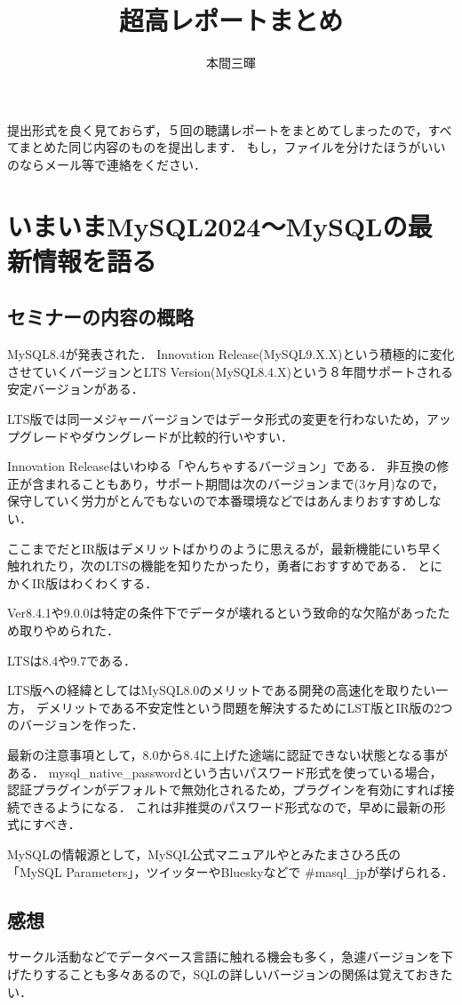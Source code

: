 \documentclass[titlepage,a4paper]{jsarticle}
\title{超高レポートまとめ}
\author{本間三暉}
\begin{document}
\maketitle
提出形式を良く見ておらず，５回の聴講レポートをまとめてしまったので，すべてまとめた同じ内容のものを提出します．
もし，ファイルを分けたほうがいいのならメール等で連絡をください．
\section{いまいまMySQL2024〜MySQLの最新情報を語る} %
\subsection{セミナーの内容の概略}
MySQL8.4が発表された．
Innovation Release(MySQL9.X.X)という積極的に変化させていくバージョンとLTS Version(MySQL8.4.X)という８年間サポートされる安定バージョンがある．

LTS版では同一メジャーバージョンではデータ形式の変更を行わないため，アップグレードやダウングレードが比較的行いやすい．

Innovation Releaseはいわゆる「やんちゃするバージョン」である．
非互換の修正が含まれることもあり，サポート期間は次のバージョンまで(3ヶ月)なので，保守していく労力がとんでもないので本番環境などではあんまりおすすめしない．

ここまでだとIR版はデメリットばかりのように思えるが，最新機能にいち早く触れれたり，次のLTSの機能を知りたかったり，勇者におすすめである．
とにかくIR版はわくわくする．

Ver8.4.1や9.0.0は特定の条件下でデータが壊れるという致命的な欠陥があったため取りやめられた．

LTSは8.4や9.7である．

LTS版への経緯としてはMySQL8.0のメリットである開発の高速化を取りたい一方，
デメリットである不安定性という問題を解決するためにLST版とIR版の2つのバージョンを作った．

最新の注意事項として，8.0から8.4に上げた途端に認証できない状態となる事がある．
mysql\_native\_passwordという古いパスワード形式を使っている場合，
認証プラグインがデフォルトで無効化されるため，プラグインを有効にすれば接続できるようになる．
これは非推奨のパスワード形式なので，早めに最新の形式にすべき．

MySQLの情報源として，MySQL公式マニュアルやとみたまさひろ氏の「MySQL Parameters」，ツイッターやBlueskyなどで \#masql\_jpが挙げられる．
\subsection{感想}
サークル活動などでデータベース言語に触れる機会も多く，急遽バージョンを下げたりすることも多々あるので，SQLの詳しいバージョンの関係は覚えておきたい．
\end{document}
